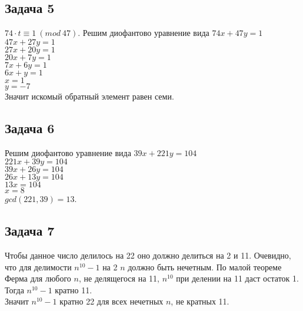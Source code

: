	
	\subsection{Задача 5}
	$74 \cdot t \equiv 1\  (mod\  47)$.
	Решим диофантово уравнение вида 
	$74x + 47y = 1$\\
	$47x + 27y = 1$\\
	$27x + 20y = 1$\\
	$20x + 7y = 1$\\
	$7x + 6y = 1$\\
	$6x + y = 1$\\
	$x = 1$\\
	$y = -7$\\
	Значит искомый обратный элемент равен семи.
	
	\subsection{Задача 6}
	Решим диофантово уравнение вида 
	$39x + 221y = 104$\\
	$221x + 39y = 104$\\
	$39x + 26y = 104$\\
	$26x + 13y = 104$\\
	$13x = 104$\\
	$x = 8$\\
	$gcd(221, 39) = 13$.
	
	\subsection{Задача 7}
	Чтобы данное число делилось на 22 оно должно делиться на 2 и 11.
	Очевидно, что для делимости $n^{10} - 1$ на 2  $n$ должно быть нечетным.
	По малой теореме Ферма для любого $n$, не делящегося на 11, $n^{10}$ при делении на 11 даст остаток 1. Тогда $n^{10} - 1$ кратно 11. \\
	Значит $n^{10} - 1$ кратно 22 для всех нечетных $n$, не кратных 11.
